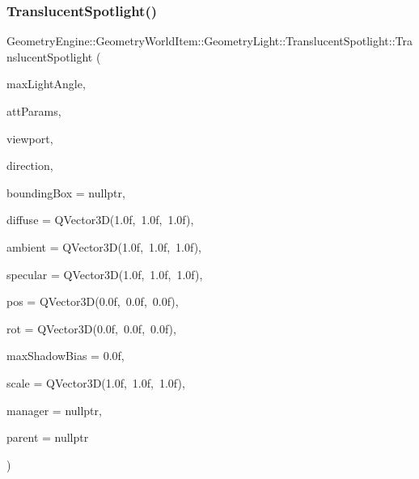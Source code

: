 \subsubsection{\texorpdfstring{TranslucentSpotlight()}{TranslucentSpotlight()}\hspace{0.1cm}{\footnotesize\ttfamily [1/2]}}
{\footnotesize\ttfamily Geometry\+Engine\+::\+Geometry\+World\+Item\+::\+Geometry\+Light\+::\+Translucent\+Spotlight\+::\+Translucent\+Spotlight (\begin{DoxyParamCaption}\item[{float}]{max\+Light\+Angle,  }\item[{const Q\+Vector3D \&}]{att\+Params,  }\item[{const \mbox{\hyperlink{class_geometry_engine_1_1_geometry_item_utils_1_1_viewport}{Geometry\+Item\+Utils\+::\+Viewport}} \&}]{viewport,  }\item[{const Q\+Vector3D \&}]{direction,  }\item[{\mbox{\hyperlink{class_geometry_engine_1_1_geometry_world_item_1_1_geometry_item_1_1_geometry_item}{Geometry\+Item\+::\+Geometry\+Item}} $\ast$}]{bounding\+Box = {\ttfamily nullptr},  }\item[{const Q\+Vector3D \&}]{diffuse = {\ttfamily QVector3D(1.0f,~1.0f,~1.0f)},  }\item[{const Q\+Vector3D \&}]{ambient = {\ttfamily QVector3D(1.0f,~1.0f,~1.0f)},  }\item[{const Q\+Vector3D \&}]{specular = {\ttfamily QVector3D(1.0f,~1.0f,~1.0f)},  }\item[{const Q\+Vector3D \&}]{pos = {\ttfamily QVector3D(0.0f,~0.0f,~0.0f)},  }\item[{const Q\+Vector3D \&}]{rot = {\ttfamily QVector3D(0.0f,~0.0f,~0.0f)},  }\item[{float}]{max\+Shadow\+Bias = {\ttfamily 0.0f},  }\item[{const Q\+Vector3D \&}]{scale = {\ttfamily QVector3D(1.0f,~1.0f,~1.0f)},  }\item[{const \mbox{\hyperlink{class_geometry_engine_1_1_light_utils_1_1_light_component_manager}{Light\+Utils\+::\+Light\+Component\+Manager}} $\ast$const}]{manager = {\ttfamily nullptr},  }\item[{\mbox{\hyperlink{class_geometry_engine_1_1_geometry_world_item_1_1_world_item}{World\+Item}} $\ast$}]{parent = {\ttfamily nullptr} }\end{DoxyParamCaption})}

